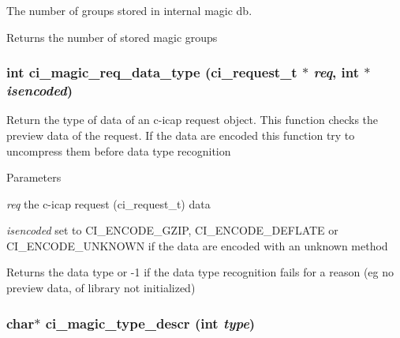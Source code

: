 The number of groups stored in internal magic db. \begin{DoxyReturn}{Returns}
the number of stored magic groups 
\end{DoxyReturn}
\hypertarget{group__DATATYPE_gafe67d34b80c1d9e4025201a8e54bd6d0}{
\subsubsection[{ci\_\-magic\_\-req\_\-data\_\-type}]{\setlength{\rightskip}{0pt plus 5cm}int ci\_\-magic\_\-req\_\-data\_\-type ({\bf ci\_\-request\_\-t} $\ast$ {\em req}, \/  int $\ast$ {\em isencoded})}}
\label{group__DATATYPE_gafe67d34b80c1d9e4025201a8e54bd6d0}


Return the type of data of an c-\/icap request object. This function checks the preview data of the request. If the data are encoded this function try to uncompress them before data type recognition


\begin{DoxyParams}{Parameters}
\item[{\em req}]the c-\/icap request (ci\_\-request\_\-t) data \item[{\em isencoded}]set to CI\_\-ENCODE\_\-GZIP, CI\_\-ENCODE\_\-DEFLATE or CI\_\-ENCODE\_\-UNKNOWN if the data are encoded with an unknown method \end{DoxyParams}
\begin{DoxyReturn}{Returns}
the data type or -\/1 if the data type recognition fails for a reason (eg no preview data, of library not initialized) 
\end{DoxyReturn}
\hypertarget{group__DATATYPE_gaea712bbaee4aff2770275cd61a9bf92b}{
\subsubsection[{ci\_\-magic\_\-type\_\-descr}]{\setlength{\rightskip}{0pt plus 5cm}char$\ast$ ci\_\-magic\_\-type\_\-descr (int {\em type})}}
\label{group__DATATYPE_gaea712bbaee4aff2770275cd61a9bf92b}


